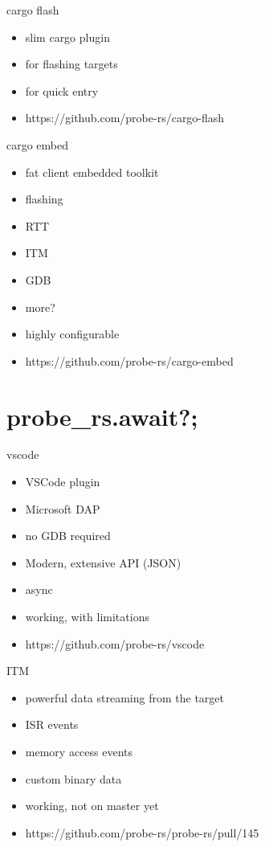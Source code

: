 \documentclass[aspectratio=1610,14pt,t]{beamer}
\begin{document}
\begin{frame}[c,fragile]{cargo flash}
  \begin{itemize}
    \item slim cargo plugin
    \item for flashing targets
    \item for quick entry
    \item https://github.com/probe-rs/cargo-flash
  \end{itemize}
\end{frame}

\begin{frame}[c,fragile]{cargo embed}
  \begin{itemize}
    \item fat client embedded toolkit
    \item flashing
    \item RTT
    \item ITM
    \item GDB
    \item more?
    \item highly configurable
    \item https://github.com/probe-rs/cargo-embed
  \end{itemize}
\end{frame}

\section{probe\_rs.await?;}

\begin{frame}[c,fragile]{vscode}
  \begin{itemize}
    \item VSCode plugin
    \item Microsoft DAP
    \item no GDB required
    \item Modern, extensive API (JSON)
    \item async
    \item working, with limitations
    \item https://github.com/probe-rs/vscode
  \end{itemize}
\end{frame}

\begin{frame}[c,fragile]{ITM}
  \begin{itemize}
    \item powerful data streaming from the target
    \item ISR events
    \item memory access events
    \item custom binary data
    \item working, not on master yet
    \item https://github.com/probe-rs/probe-rs/pull/145
  \end{itemize}
\end{frame}
\end{document}
